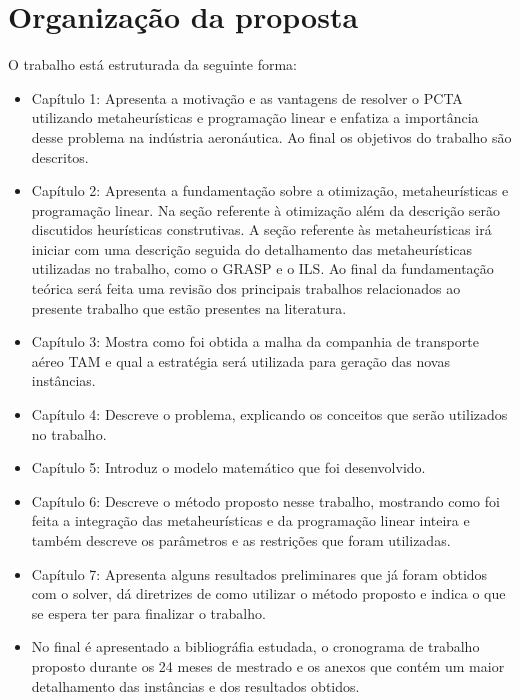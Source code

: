 \section {Organização da proposta }

O trabalho está estruturada da seguinte forma:

\begin{itemize}

\item Capítulo 1: Apresenta a motivação e as vantagens de resolver o PCTA utilizando metaheurísticas e programação linear e enfatiza a importância desse problema na indústria aeronáutica. Ao final os objetivos do trabalho são descritos.

\item Capítulo 2: Apresenta a fundamentação sobre a otimização, metaheurísticas e programação linear. Na seção referente à otimização além da descrição serão discutidos heurísticas construtivas. A seção referente às metaheurísticas irá iniciar com uma descrição seguida do detalhamento das metaheurísticas utilizadas no trabalho, como o GRASP e o ILS. Ao final da fundamentação teórica será feita uma revisão dos principais trabalhos relacionados ao presente trabalho que estão presentes na literatura.

\item Capítulo 3: Mostra como foi obtida a malha da companhia de transporte aéreo TAM e qual a estratégia será utilizada para geração das novas instâncias.

\item Capítulo 4: Descreve o problema, explicando os conceitos que serão utilizados no trabalho.

\item Capítulo 5: Introduz o modelo matemático que foi desenvolvido.

\item Capítulo 6: Descreve o método proposto nesse trabalho, mostrando como foi feita a integração das metaheurísticas e da programação linear inteira e também descreve os parâmetros e as restrições que foram utilizadas.

\item Capítulo 7: Apresenta alguns resultados preliminares que já foram obtidos com o solver, dá diretrizes de como utilizar o método proposto e indica o que se espera ter para finalizar o trabalho.

\item No final é apresentado a bibliográfia estudada, o cronograma de trabalho proposto durante os 24 meses de mestrado e os anexos que contém um maior detalhamento das instâncias e dos resultados obtidos.

\end{itemize}